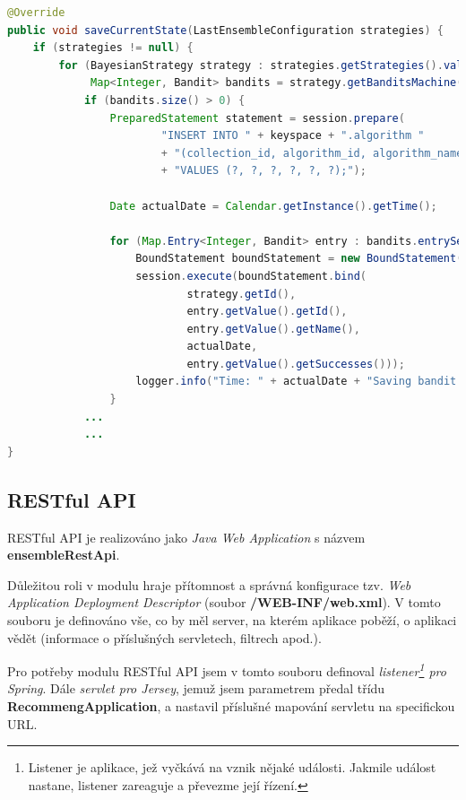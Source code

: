 \documentclass[thesis=M,czech]{FITthesis}[2014/05/07]
\begin{document}
\begin{lstlisting}[language=java]
@Override
public void saveCurrentState(LastEnsembleConfiguration strategies) {
    if (strategies != null) {
        for (BayesianStrategy strategy : strategies.getStrategies().values()) {
             Map<Integer, Bandit> bandits = strategy.getBanditsMachine().getBanditList();
            if (bandits.size() > 0) {
                PreparedStatement statement = session.prepare(
                        "INSERT INTO " + keyspace + ".algorithm "
                        + "(collection_id, algorithm_id, algorithm_name, event_time, trials_rate, successes_rate) "
                        + "VALUES (?, ?, ?, ?, ?, ?);");

                Date actualDate = Calendar.getInstance().getTime();

                for (Map.Entry<Integer, Bandit> entry : bandits.entrySet()) {
                    BoundStatement boundStatement = new BoundStatement(statement);
                    session.execute(boundStatement.bind(
                            strategy.getId(),
                            entry.getValue().getId(),
                            entry.getValue().getName(),
                            actualDate,
                            entry.getValue().getSuccesses()));
                    logger.info("Time: " + actualDate + "Saving bandit with ID " + entry.getValue().getName() + " into collection : " + strategy.getCollectionId());
                }
			...
			...			
}
\end{lstlisting}

\subsection{RESTful API}
\label{sub:restapi}

RESTful API je realizováno jako \emph{Java Web Application} s názvem \textbf{ensembleRestApi}.

Důležitou roli v modulu hraje přítomnost a správná konfigurace tzv. \emph{Web Application Deployment Descriptor} (soubor \textbf{/WEB-INF/web.xml}). V tomto souboru je definováno vše, co by měl server, na kterém aplikace poběží, o aplikaci vědět (informace o příslušných servletech, filtrech apod.).

Pro potřeby modulu RESTful API jsem v tomto souboru definoval \emph{listener\footnote{Listener je aplikace, jež vyčkává na vznik nějaké události. Jakmile událost nastane, listener zareaguje a převezme její řízení.} pro Spring}. Dále \emph{servlet pro Jersey}, jemuž jsem parametrem předal třídu \textbf{RecommengApplication}, a nastavil příslušné mapování servletu na specifickou URL.
\end{document}
